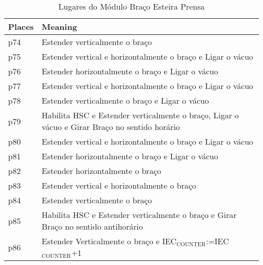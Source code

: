 \begin{table}[htbp]
\caption{Lugares do Módulo Braço Esteira Prensa}
\centering
\begin{tabular}{ll}
Places & Meaning\\
\hline
p74 & Estender verticalmente o braço\\
p75 & Estender vertical e horizontalmente o braço e Ligar o vácuo\\
p76 & Estender horizontalmente o braço e Ligar o vácuo\\
p77 & Estender vertical e horizontalmente o braço e Ligar o vácuo\\
p78 & Estender verticalmente o braço e Ligar o vácuo\\
p79 & Habilita HSC e Estender verticalmente o braço, Ligar o vácuo e Girar Braço no sentido horário\\
p80 & Estender vertical e horizontalmente o braço e Ligar o vácuo\\
p81 & Estender horizontalmente o braço e Ligar o vácuo\\
p82 & Estender horizontalmente o braço\\
p83 & Estender vertical e horizontalmente o braço\\
p84 & Estender verticalmente o braço\\
p85 & Habilita HSC e Estender verticalmente o braço e Girar Braço no sentido antihorário\\
p86 & Estender Verticalmente o braço e IEC\(_{\text{COUNTER}}\):=IEC\(_{\text{COUNTER}}\)+1\\
\end{tabular}
\end{table}

